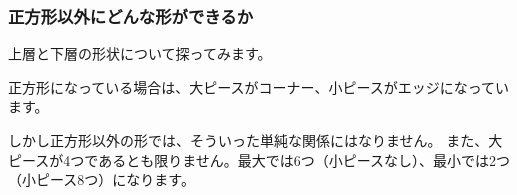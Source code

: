 \documentclass{beamer}
\def\lpiece{-- ([turn]180:1) -- ([turn]-120:1) -- ([turn]-75:0.707) -- cycle}
\def\spiece{-- ([turn]180:1) -- ([turn]-150:1) -- cycle}
\begin{document}
\begin{frame}
    \frametitle{正方形以外にどんな形ができるか}

    上層と下層の形状について探ってみます。

    正方形になっている場合は、大ピースがコーナー、小ピースがエッジになっています。

    \begin{figure}
        \centering
        \begin{subfigure}{0.40\columnwidth}
        \end{subfigure}
        \begin{subfigure}{0.40\columnwidth}
        \end{subfigure}
    \end{figure}

    しかし正方形以外の形では、そういった単純な関係にはなりません。
    また、大ピースが4つであるとも限りません。最大では6つ（小ピースなし）、最小では2つ（小ピース8つ）になります。
\end{frame}
\end{document}
